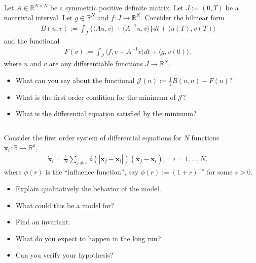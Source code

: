 \documentclass[12pt,a4paper]{article}
\newcommand{\from}{\colon}
\begin{document}
    Let $A \in \mathbb{R}^{N \times N}$ be a symmetric positive definite matrix.
    Let $J := (0, T)$ be a nontrivial interval.
    Let $g \in \mathbb{R}^N$ and $f \from J \to \mathbb{R}^N$.
    Consider the bilinear form
    \begin{align}
        B(u, v) :=
        \int_J \{
            \langle A u, v \rangle
            +
            \langle A^{-1} \dot{u}, \dot{v} \rangle
        \} dt
        +
        \langle u(T), v(T) \rangle
    \end{align}
    and the functional
    \begin{align}
        F(v) :=
        \int_J 
            \langle f, v + A^{-1} \dot{v} \rangle
        dt
        +
        \langle g, v(0) \rangle
        ,
    \end{align}
    where $u$ and $v$ are any differentiable functions $J \to \mathbb{R}^N$.
    
    \begin{itemize}
    \item
        What can you say about the functional
        $
            \mathcal{J}(u) :=
            \frac12 B(u, u) - F(u)
        $?
    \item
        What is the first order condition for the minimum of $\mathcal{J}$?
    \item
        What is the differential equation satisfied by the minimum?
    \end{itemize}

    

    
    \subsection{}
    
    Consider the first order system of differential equations
    for $N$ functions $\mathbf{x}_i \from \mathbb{R} \to \mathbb{R}^d$,
    \begin{align}
        \dot{\mathbf{x}}_i
        =
        \frac{1}{N} 
        \sum_{j \neq i}
        \phi(|\mathbf{x}_j - \mathbf{x}_i|)
        ( \mathbf{x}_j - \mathbf{x}_i )
        ,
        \quad
        i = 1, \ldots, N
        ,
    \end{align}
    where $\phi(r)$ is the ``influence function'',
    say $\phi(r) := (1 + r)^{-s}$ for some $s > 0$.
    
    \begin{itemize}
    \item 
        Explain qualitatively the behavior of the model.
    \item
        What could this be a model for?
    \item
        Find an invariant.
    \item
        What do you expect to happen in the long run?
    \item
        Can you verify your hypothesis?
    \end{itemize}
    
\end{document}
